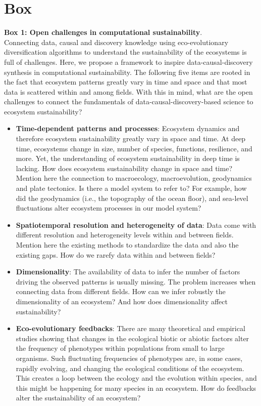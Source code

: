 \documentclass[12pt,a4paper]{article}
\begin{document}
\section{Box}

\vspace{0.25 in}
{\small \begin{tcolorbox}[colback=green!5!white,colframe=green!75!black]
  \textbf{Box 1: Open challenges in computational sustainability}. \\Connecting data, causal and discovery knowledge using eco-evolutionary diversification algorithms to understand the sustainability of the ecosystems is full of challenges. Here, we propose a framework to inspire data-causal-discovery synthesis in computational sustainability. The following five items are rooted in the fact that ecosystem patterns greatly vary in time and space and that most data is scattered within and among fields. With this in mind, what are the open challenges to connect the fundamentals of data-causal-discovery-based science to ecosystem sustainability?
\begin{itemize}
\item {\bf Time-dependent patterns and processes}: Ecosystem dynamics and therefore ecosystem sustainability greatly vary in space and time. At deep time, ecosystems change in size, number of species, functions, resilience, and more. Yet, the understanding of ecosystem sustainability in deep time is lacking. How does ecosystem sustainability change in space and time? Mention here the connection to macroecology, macroevolution, geodynamics and plate tectonics. Is there a model system to refer to? For example, how did the geodynamics (i.e., the topography of the ocean floor), and sea-level fluctuations alter ecosystem processes in our model system?
\item {\bf Spatiotemporal resolution and heterogeneity of data}: Data come with different resolution and heterogeneity levels within and between fields. Mention here the existing methods to standardize the data and also the existing gaps. How do we rarefy data within and between fields?
\item {\bf Dimensionality}: The availability of data to infer the number of factors driving the observed patterns is usually missing. The problem increases when connecting data from different fields. How can we infer robustly the dimensionality of an ecosystem? And how does dimensionality affect sustainability?    
\item {\bf Eco-evolutionary feedbacks}: There are many theoretical and empirical studies showing that changes in the ecological biotic or abiotic factors alter the frequency of phenotypes within populations from small to large organisms. Such fluctuating frequencies of phenotypes are, in some cases, rapidly evolving, and changing the ecological conditions of the ecosystem. This creates a loop between the ecology and the evolution within species, and this might be happening for many species in an ecosystem. How do feedbacks alter the sustainability of an ecosystem? 

\end{itemize}
\end{tcolorbox}}
\end{document}
